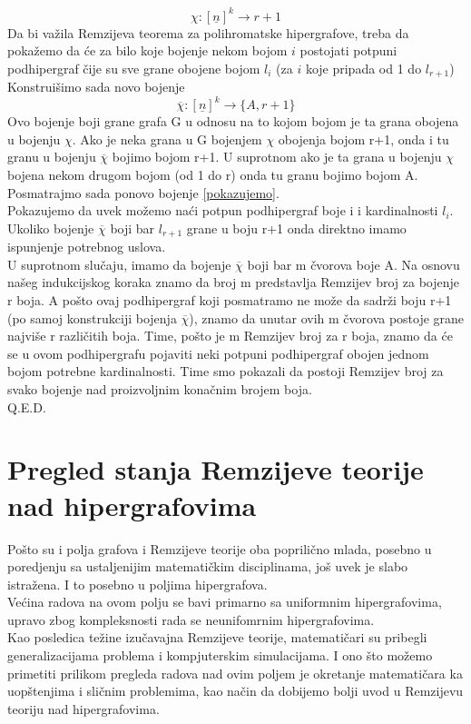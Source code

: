 \documentclass[a4paper]{article}
\begin{document}
\begin{description}
		\begin{equation}\label{pokazujemo}
		\chi : [\underline{n}]^k \rightarrow r+1
		\end{equation}
		Da bi važila Remzijeva teorema za polihromatske hipergrafove, treba da pokažemo da će za bilo koje bojenje nekom bojom $i$ postojati potpuni podhipergraf čije su sve grane obojene bojom $l_i$ (za $i$ koje pripada od 1 do $l_{r+1}$) %
		Konstruišimo sada novo bojenje 
		\begin{equation}
			\overline{\chi} : [\underline{n}]^k \rightarrow \{A, r+1\}
		\end{equation}
		Ovo bojenje  boji grane grafa G u odnosu na to kojom bojom je ta grana obojena u bojenju $\chi$. Ako je neka grana u G bojenjem $\chi$ obojenja bojom r+1, onda i tu granu u bojenju $\overline{\chi}$ bojimo bojom r+1. U suprotnom ako je ta grana u bojenju $\chi$ bojena nekom drugom bojom (od 1 do r) onda tu granu bojimo bojom A.\\
		Posmatrajmo sada ponovo bojenje \ref{pokazujemo}.\\
		Pokazujemo da uvek možemo naći potpun podhipergraf boje i i kardinalnosti $l_i$.
		Ukoliko bojenje $\overline{\chi}$ boji bar $l_{r+1}$ grane u boju r+1 onda direktno imamo ispunjenje potrebnog uslova.
		\\
		U suprotnom slučaju, imamo da bojenje $\overline{\chi}$ boji bar m čvorova boje A. Na osnovu našeg indukcijskog koraka znamo da broj m predstavlja Remzijev broj za bojenje r boja. A pošto ovaj podhipergraf koji posmatramo ne može da sadrži boju r+1 (po samoj konstrukciji bojenja $\overline{\chi}$), znamo da unutar ovih m čvorova postoje grane najviše r različitih boja. Time, pošto je m Remzijev broj za r boja, znamo da će se u ovom podhipergrafu pojaviti neki potpuni podhipergraf obojen jednom bojom potrebne kardinalnosti. Time smo pokazali da postoji Remzijev broj za svako bojenje nad proizvoljnim konačnim brojem boja. \\
		Q.E.D.
 	\end{description}
	\section{Pregled stanja Remzijeve teorije nad hipergrafovima}
	Pošto su i polja grafova i Remzijeve teorije oba poprilično mlada, posebno u poredjenju sa ustaljenijim matematičkim disciplinama, još uvek je slabo istražena. I to posebno u poljima hipergrafova.\\ Većina radova na ovom polju se bavi primarno sa uniformnim hipergrafovima, upravo zbog kompleksnosti rada se neunifomrnim hipergrafovima.\\ Kao posledica težine izučavajna Remzijeve teorije, matematičari su pribegli generalizacijama problema i kompjuterskim simulacijama. I ono što možemo primetiti prilikom pregleda radova nad ovim poljem je okretanje matematičara ka uopštenjima i sličnim problemima, kao način da dobijemo bolji uvod u Remzijevu teoriju nad hipergrafovima.
\end{document}
